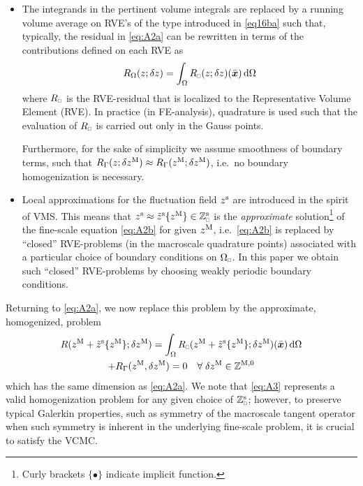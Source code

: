 \documentclass{bmcart}
\newcommand{\eqtref}[1]{\eqref{#1}}
\newcommand{\rve}{
  {\mathchoice
   {\mbox{\scalebox{0.67}{$\Box$}}}
   {\mbox{\scalebox{0.67}{$\Box$}}}
   {\mbox{\scalebox{0.5}{$\Box$}}}
   {\mbox{\scalebox{0.375}{$\Box$}}}
  }
}
\begin{document}
\begin{itemize}
\item The integrands in the pertinent volume integrals are replaced by a running volume average on RVE's of the type introduced in \eqtref{eq16ba}
such that, typically, the residual in \eqtref{eq:A2a} can be rewritten in terms of the contributions defined on each RVE as
\begin{align}
\label{eq:A106} R_\Omega(z;\delta z) = \int_\Omega R_\rve(z;\delta z)(\bar{\ta x})\dif\Omega
\end{align}
where $R_\rve$ is the RVE-residual that is localized to the Representative Volume Element (RVE).
In practice (in FE-analysis), quadrature is used such that the evaluation of $R_\rve$ is carried out only in the Gauss points.

Furthermore, for the sake of simplicity we assume smoothness of boundary terms, such that $R_\Gamma(z; \delta z^{\mathrm{M}}) \approx R_\Gamma(z^{\mathrm{M}};\delta z^{\mathrm{M}})$, i.e.\ no boundary homogenization is necessary.

\item Local approximations for the fluctuation field $z^{\mathrm{s}}$ are introduced in the spirit of VMS.
This means that $z^\fluct \approx \tilde{z}^\fluct\{z^\macro\}\in\set{Z}_\rve^{\fluct}$ is the \emph{approximate} solution\footnote{Curly brackets $\{\bullet\}$ indicate implicit function.} of the fine-scale 
equation \eqtref{eq:A2b} for given $z^{\mathrm{M}}$, i.e.\ \eqtref{eq:A2b} is replaced by ``closed'' RVE-problems (in the macroscale quadrature points) associated with a particular choice of boundary conditions on $\Omega_\rve$.
In this paper we obtain such ``closed'' RVE-problems by choosing  weakly periodic boundary conditions.
\end{itemize}
Returning to \eqtref{eq:A2a}, we now replace this problem by the approximate, homogenized, problem
\begin{multline}
\label{eq:A3} R(z^\macro+\tilde{z}^\fluct\{z^\macro\};\delta z^\macro) = \int_\Omega R_\rve(z^\macro+\tilde{z}^\fluct\{z^\macro\};\delta z^\macro)(\bar{\ta x})\dif\Omega
 \\
 + R_\Gamma(z^\macro, \delta z^\macro) = 0 \quad \forall\;\delta z^\macro \in \set Z^{\macro,0}
\end{multline}
which has the same dimension as \eqtref{eq:A2a}.
We note that \eqtref{eq:A3} represents a valid homogenization problem for any given choice of $\set{Z}_\rve^{\fluct}$; however, to preserve typical Galerkin properties, such as symmetry of the macroscale tangent operator when such symmetry is inherent in the underlying fine-scale problem, it is crucial to satisfy the VCMC.
\end{document}
